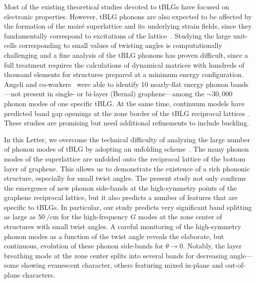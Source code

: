 \documentclass[prl,preprint]{revtex4}
\newcommand{\wavenumber}{\per\cm}
\begin{document}
Most of the existing theoretical studies devoted to tBLGs have focused on electronic properties. However, tBLG phonons are also expected to be affected by the formation of the moir\'e superlattice and its underlying strain fields, since they fundamentally correspond to excitations of the lattice~\cite{Cocemasov2013,Choi2018,Angeli2019}. Studying the large unit-cells corresponding to small values of twisting angles is computationally challenging and a fine analysis of the tBLG phonons has proven difficult, since a full treatment requires the calculations of dynamical matrices with hundreds of thousand elements for structures prepared at a minimum energy configuration. Angeli and co-workers~\cite{Angeli2019} were able to identify 10 nearly-flat energy phonon bands---not present in single-  or bi-layer (Bernal) graphene---among the $\sim 30,000$ phonon modes of one specific tBLG. At the same time, continuum models have predicted band gap openings at the zone border of the tBLG reciprocal lattices~\cite{Koshino2019a,Koshino2019b}. These studies are promising but need additional refinements to include buckling.

In this Letter, we overcome the technical difficulty of  analyzing the large number of phonon modes of tBLG by adopting an unfolding scheme~\cite{allen2013RecoveringHiddenBloch}. The many phonon modes of the superlattice are unfolded onto the reciprocal lattice of the bottom layer of graphene. This allows us to demonstrate the existence of a rich phononic structure, especially for small twist angles. The present study not only confirms the emergence of new phonon side-bands at the high-symmetry points of the graphene reciprocal lattice, but it also predicts a number of features that are specific to tBLGs. In particular, our study predicts very significant band splitting as large as $\SI{50}{\wavenumber}$ for the high-frequency $G$ modes at the zone center of structures with small twist angles. A careful monitoring of the high-symmetry phonon modes as a function of the twist angle reveals the elaborate, but continuous, evolution of these phonon side-bands for $\theta \rightarrow 0$. Notably, the layer breathing mode at the zone center splits into several bands for decreasing angle---some showing evanescent character, others featuring mixed in-plane and out-of-plane characters.
\end{document}
